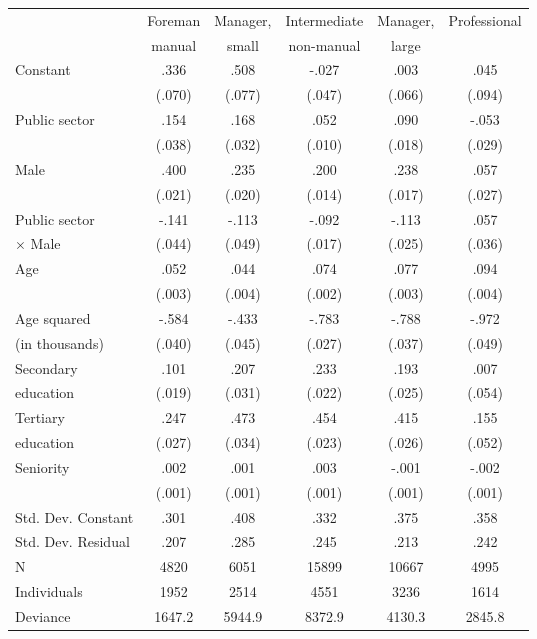 \documentclass[a4paper,11pt,titlepage]{article}
\begin{document}
\begin{table}[t]
    \begin{tabularx}{\textwidth}{Yccccc}
    \toprule
    &Foreman& Manager,&	Intermediate&	Manager,&	Professional\\
    &manual & small & non-manual & large \\
    \midrule
    Constant				&	.336	&	.508	&	-.027	&	.003	&	.045\\
    								&(.070)	&(.077)	&(.047)	&(.066)	&(.094)\\
    Public sector		&	.154	&	.168	&	.052	& .090	&-.053\\
    								&(.038)	&(.032)	&(.010)	&(.018)	&(.029)\\
    Male						&	.400	&	.235	&	.200	&	.238	&	.057\\
    								&(.021)	&(.020)	&(.014)	&(.017)	&(.027)\\
    Public sector		&	-.141	&	-.113	&	-.092	&	-.113	&	.057\\
    \quad $\times$ Male%
    								&(.044)&(.049)	&(.017)	&(.025)	&(.036)\\
    Age							&.052		&	.044	&	.074	&	.077	&	.094\\
    								&(.003)	&(.004)	&(.002)	&(.003)	&(.004)\\
    Age squared			&	-.584	&	-.433	&	-.783	&-.788	&-.972\\
    \quad (in thousands)%
    								&(.040)&(.045)	&(.027)	&(.037)	&(.049)\\
    Secondary 			&	.101	&	.207	&	.233	&	.193	&	.007\\
    \quad education	&(.019)	&(.031)	&(.022)	&(.025)	&(.054)\\
    Tertiary				&	.247	&	.473	&	.454	&	.415	&	.155\\
    \quad education	&(.027)	&(.034)	&(.023)	&(.026)	&(.052)\\
    Seniority				&	.002	&	.001	&	.003	&	-.001	&	-.002\\
    								&(.001)	&(.001)	&(.001)	&(.001)	&(.001)\\
    \midrule
    Std. Dev. Constant&	.301&	.408	&	.332	&	.375	&	.358\\
    Std. Dev. Residual&	.207&	.285	&	.245	&	.213	&	.242\\
    N									&	4820&	6051	&15899	&	10667	&4995\\
    Individuals				&	1952&	2514	&4551		&	3236	&1614\\
    Deviance					&1647.2&5944.9&8372.9 &4130.3 &2845.8\\
    \bottomrule
    \end{tabularx}
\end{table}
\end{document}
